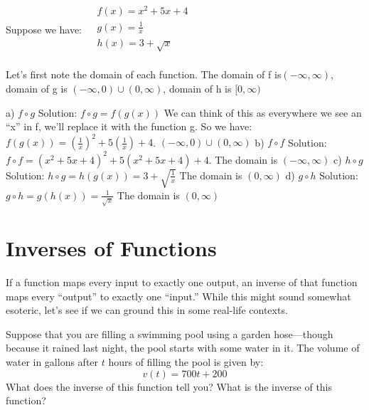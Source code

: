 \documentclass{ximera}
\begin{document}
\begin{example}
 Suppose we have:
$\begin{align}
  & f(x)={{x}^{2}}+5x+4 \\ 
 & g(x)=\frac{1}{x} \\ 
 & h(x)=3+\sqrt{x} \\ 
\end{align}$

Let’s first note the domain of each function.  The domain of f is$(-\infty ,\infty )$, domain of g is $(-\infty ,0)\cup (0,\infty )$, domain of h is $[0,\infty )$
 
a)	$f\circ g$ 
Solution: $f\circ g=f(g(x))$ We can think of this as everywhere we see an “x” in f, we’ll replace it with the function g. So we have: $f(g(x))={{\left( \frac{1}{x} \right)}^{2}}+5\left( \frac{1}{x} \right)+4$.  $(-\infty ,0)\cup (0,\infty )$
b)	$f\circ f$ 
Solution: $f\circ f={{\left( {{x}^{2}}+5x+4 \right)}^{2}}+5\left( {{x}^{2}}+5x+4 \right)+4$.  The domain is $(-\infty ,\infty )$
c)	$h\circ g$  
Solution: $h\circ g=h(g(x))=3+\sqrt{\frac{1}{x}}$ The domain is $(0,\infty )$
d)	$g\circ h$ 
Solution:$g\circ h=g(h(x))=\frac{1}{\sqrt{x}}$ The domain is $(0,\infty )$
\end{example}



\section{Inverses of Functions}


If a function maps every input to exactly one output, an inverse of that
function maps every ``output'' to exactly one ``input.'' While this
might sound somewhat esoteric, let's see if we can ground this in
some real-life contexts.

\begin{example}
Suppose that you are filling a swimming pool using a garden
hose---though because it rained last night, the pool starts with some
water in it. The volume of water in gallons after $t$ hours of
filling the pool is given by:
\[
v(t) = 700t + 200
\]
What does the inverse of this function tell you? What is the inverse
of this function?
\end{example}
\end{document}

